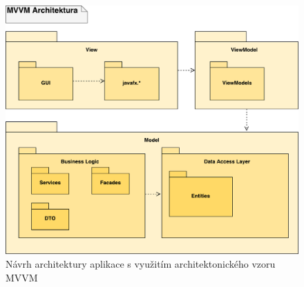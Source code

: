 \newpage
\begin{figure}[h!]
\begin{center}
\includegraphics[scale=0.75]{../02_Vysledne_modely/03_1_ProjectArchitecture.pdf}
\caption{Návrh architektury aplikace s využitím architektonického vzoru MVVM}
\label{fig:communication09-1}
\end{center}
\end{figure}

